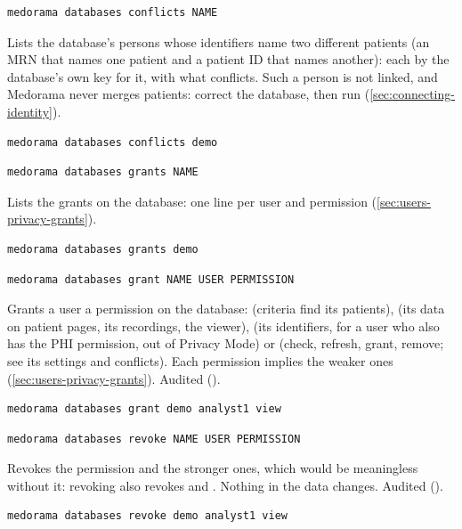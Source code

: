 \begin{lstlisting}[style=signature]
medorama databases conflicts NAME
\end{lstlisting}
Lists the database's persons whose identifiers name two different patients (an MRN that names
one patient and a patient ID that names another): each by the database's own key for it, with
what conflicts. Such a person is not linked, and Medorama never merges patients: correct the
database, then run  (\cref{sec:connecting-identity}).
\begin{lstlisting}[style=shell]
medorama databases conflicts demo
\end{lstlisting}

\begin{lstlisting}[style=signature]
medorama databases grants NAME
\end{lstlisting}
Lists the grants on the database: one line per user and permission (\cref{sec:users-privacy-grants}).
\begin{lstlisting}[style=shell]
medorama databases grants demo
\end{lstlisting}

\begin{lstlisting}[style=signature]
medorama databases grant NAME USER PERMISSION
\end{lstlisting}
Grants a user a permission on the database:  (criteria find its patients),
 (its data on patient pages, its recordings, the viewer),  (its identifiers,
for a user who also has the PHI permission, out of Privacy Mode) or  (check,
refresh, grant, remove; see its settings and conflicts). Each permission implies the weaker ones
(\cref{sec:users-privacy-grants}). Audited ().
\begin{lstlisting}[style=shell]
medorama databases grant demo analyst1 view
\end{lstlisting}

\begin{lstlisting}[style=signature]
medorama databases revoke NAME USER PERMISSION
\end{lstlisting}
Revokes the permission and the stronger ones, which would be meaningless without it: revoking
 also revokes  and . Nothing in the data changes. Audited
().
\begin{lstlisting}[style=shell]
medorama databases revoke demo analyst1 view
\end{lstlisting}


